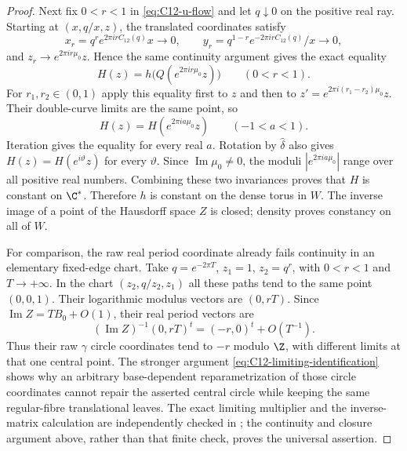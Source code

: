 \begin{proof}
Next fix $0<r<1$ in \eqref{eq:C12-u-flow} and let $q\downarrow0$
on the positive real ray. Starting at $(x,q/x,z)$, the translated
coordinates satisfy
\[
 x_r=q^r e^{2\pi i r C_{12}(q)}x\longrightarrow0,\qquad
 y_r=q^{1-r} e^{-2\pi i r C_{12}(q)}/x\longrightarrow0,
\]
and $z_r\longrightarrow e^{2\pi i r\mu_0}z$. Hence the same
continuity argument gives the exact equality
\begin{equation}\label{eq:C12-limiting-identification}
 H(z)=h\bigl(Q(e^{2\pi i r\mu_0}z)\bigr)
 \qquad(0<r<1).
\end{equation}
For $r_1,r_2\in(0,1)$ apply this equality first to $z$ and
then to $z'=e^{2\pi i(r_1-r_2)\mu_0}z$. Their double-curve
limits are the same point, so
\[
 H(z)=H(e^{2\pi i a\mu_0}z)\qquad(-1<a<1).
\]
Iteration gives the equality for every real $a$. Rotation by
$\widehat\delta$ also gives $H(z)=H(e^{i\vartheta}z)$ for every
$\vartheta$. Since $\operatorname{Im}\mu_0\ne0$, the moduli
$|e^{2\pi i a\mu_0}|$ range over all positive real numbers.
Combining these two invariances proves that $H$ is constant on
$\C^*$. Therefore $h$ is constant on the dense torus in $W$.
The inverse image of a point of the Hausdorff space $Z$ is
closed; density proves constancy on all of $W$.

For comparison, the raw real period coordinate already fails
continuity in an elementary fixed-edge chart. Take
$q=e^{-2\pi T}$, $z_1=1$, $z_2=q^r$, with $0<r<1$ and
$T\to+\infty$. In the chart
$(z_2,q/z_2,z_1)$ all these paths tend to the same point
$(0,0,1)$. Their logarithmic modulus vectors are $(0,rT)$.
Since $\operatorname{Im}Z=TB_0+O(1)$, their real period
vectors are
\[
 (\operatorname{Im}Z)^{-1}(0,rT)^t
                  =(-r,0)^t+O(T^{-1}).
\]
Thus their raw $\gamma$ circle coordinates tend to $-r$ modulo
$\Z$, with different limits at that one central point. The
stronger argument \eqref{eq:C12-limiting-identification} shows
why an arbitrary base-dependent reparametrization of those
circle coordinates cannot repair the asserted central circle
while keeping the same regular-fibre translational leaves.
The exact limiting multiplier and the inverse-matrix calculation
are independently checked in
; the continuity
and closure argument above, rather than that finite check,
proves the universal assertion.
\end{proof}
